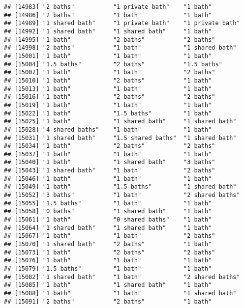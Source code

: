 \documentclass[
]{article}
\begin{document}
\begin{verbatim}
## [14983] "2 baths"           "1 private bath"    "1 bath"           
## [14986] "2 baths"           "1 bath"            "1 bath"           
## [14989] "1 shared bath"     "1 private bath"    "1 private bath"   
## [14992] "1 shared bath"     "1 shared bath"     "1 bath"           
## [14995] "1 bath"            "2 baths"           "2 baths"          
## [14998] "2 baths"           "1 bath"            "1 shared bath"    
## [15001] "1 bath"            "1 bath"            "1 bath"           
## [15004] "1.5 baths"         "2 baths"           "1.5 baths"        
## [15007] "1 bath"            "1 bath"            "2 baths"          
## [15010] "1 bath"            "2 baths"           "1 bath"           
## [15013] "1 bath"            "1 bath"            "1 bath"           
## [15016] "1 bath"            "2 baths"           "2 baths"          
## [15019] "1 bath"            "1 bath"            "1 bath"           
## [15022] "1 bath"            "1.5 baths"         "1 bath"           
## [15025] "1 bath"            "1 shared bath"     "1 shared bath"    
## [15028] "4 shared baths"    "1 bath"            "1 bath"           
## [15031] "1 shared bath"     "1.5 shared baths"  "1 shared bath"    
## [15034] "1 bath"            "2 baths"           "2 baths"          
## [15037] "1 bath"            "1 bath"            "1 bath"           
## [15040] "1 bath"            "1 shared bath"     "3 baths"          
## [15043] "1 shared bath"     "1 bath"            "2 baths"          
## [15046] "1 bath"            "1 bath"            "1 bath"           
## [15049] "1 bath"            "1.5 baths"         "1 shared bath"    
## [15052] "3 baths"           "1 bath"            "2 shared baths"   
## [15055] "1.5 baths"         "1 bath"            "1 bath"           
## [15058] "0 baths"           "1 shared bath"     "1 bath"           
## [15061] "1 bath"            "0 shared baths"    "1 bath"           
## [15064] "1 shared bath"     "1 shared bath"     "1 bath"           
## [15067] "1 bath"            "1 bath"            "2 baths"          
## [15070] "1 shared bath"     "2 baths"           "1 bath"           
## [15073] "1 bath"            "2 baths"           "2 baths"          
## [15076] "1 bath"            "1 bath"            "1 bath"           
## [15079] "1.5 baths"         "1 bath"            "1 bath"           
## [15082] "1 shared bath"     "1 bath"            "2 shared baths"   
## [15085] "1 bath"            "1 shared bath"     "1 bath"           
## [15088] "1 bath"            "1 bath"            "1 shared bath"    
## [15091] "2 baths"           "2 baths"           "1 bath"           

\end{verbatim}
\end{document}
